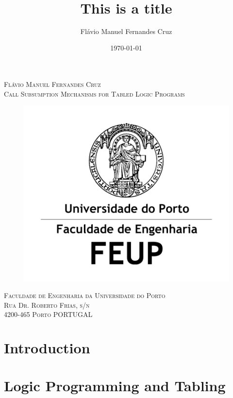 \documentclass[11pt]{report}
\title{\fontsize{20}{30}\bfseries This is a title}
\author{Flávio Manuel Fernandes Cruz \\}
\date{\today}
\begin{document}
  
\begin{titlepage}

\begin{center}
  
\textsc{\large Flávio Manuel Fernandes Cruz}\\[1.5cm]

\textsc{\LARGE Call Subsumption Mechanisms for Tabled Logic Programs}
\begin{figure}[ht]
  \centering
  \includegraphics[scale=1.0]{feup.pdf}
\end{figure}


\textsc{\large Faculdade de Engenharia da Universidade do Porto\\ \small Rua Dr. Roberto Frias, s/n \\ 4200-465 Porto PORTUGAL}\\[1.5cm]
  
\end{center}
\end{titlepage}

\tableofcontents
\listoffigures
\listoftables
\listofalgorithms
\clearpage

\chapter{Introduction}


\chapter{Logic Programming and Tabling}

\end{document}
